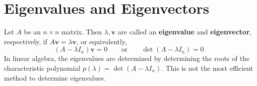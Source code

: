 \documentclass[letterpaper,12pt]{article}
\theoremstyle{definition}
\renewcommand{\vec}[1]{\mathbf{#1}}
\begin{document}
\section*{Eigenvalues and Eigenvectors}
Let $A$ be an $n \times n$ matrix. Then $\lambda, \vec{v}$ are called an \textbf{eigenvalue} and \textbf{eigenvector}, respectively, if $A \vec{v} = \lambda \vec{v}$, or equivalently,
\begin{equation*}
    (A - \lambda I_n) \vec{v} = 0 \qquad \text{or} \qquad \det(A - \lambda I_n) = 0
\end{equation*}
In linear algebra, the eigenvalues are determined by determining the roots of the characteristic polynomial $p(\lambda) = \det(A - \lambda I_n)$. This is not the most efficient method to determine eigenvalues.
\end{document}
